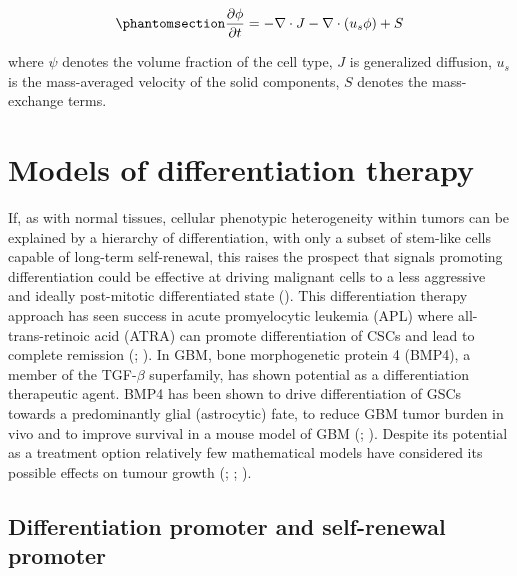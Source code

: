 \documentclass[
  letterpaper,
]{scrreprt}
\theoremstyle{definition}
\theoremstyle{remark}
\begin{document}
\begin{equation}\phantomsection\label{eq-youssefpour-multispecies}{
\frac{\partial \phi}{\partial t} = - \nabla \cdot J - \nabla \cdot (u_s \phi) + S
}\end{equation}

where \(\psi\) denotes the volume fraction of the cell type, \(J\) is
generalized diffusion, \(u_s\) is the mass-averaged velocity of the
solid components, \(S\) denotes the mass-exchange terms.

\section{Models of differentiation
therapy}\label{sec-models-of-differentiation-therapy}

If, as with normal tissues, cellular phenotypic heterogeneity within
tumors can be explained by a hierarchy of differentiation, with only a
subset of stem-like cells capable of long-term self-renewal, this raises
the prospect that signals promoting differentiation could be effective
at driving malignant cells to a less aggressive and ideally post-mitotic
differentiated state (). This differentiation therapy approach has seen success
in acute promyelocytic leukemia (APL) where all-trans-retinoic acid
(ATRA) can promote differentiation of CSCs and lead to complete
remission (;
). In GBM, bone morphogenetic
protein 4 (BMP4), a member of the TGF-\(\beta\) superfamily, has shown
potential as a differentiation therapeutic agent. BMP4 has been shown to
drive differentiation of GSCs towards a predominantly glial (astrocytic)
fate, to reduce GBM tumor burden in vivo and to improve survival in a
mouse model of GBM (;
). Despite its
potential as a treatment option relatively few mathematical models have
considered its possible effects on tumour growth
(;
;
).

\subsection{Differentiation promoter and self-renewal
promoter}\label{differentiation-promoter-and-self-renewal-promoter}
\end{document}
